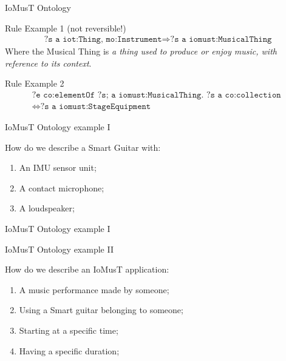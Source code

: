 \documentclass{beamer}
\begin{document}
\begin{frame}{IoMusT Ontology}
\begin{footnotesize}
\begin{block}{Rule Example 1 (not reversible!)}
\begin{multline*}
\texttt{?s a iot:Thing, mo:Instrument} 
\Rightarrow
\texttt{?s a iomust:MusicalThing}
\end{multline*}
Where the Musical Thing is \textit{a thing used to produce or enjoy music, with reference to its context}.

\end{block}\pause
\begin{block}{Rule Example 2}
\begin{multline*}
\texttt{?e co:elementOf ?s; a iomust:MusicalThing. ?s a co:collection } \\
\Leftrightarrow
\texttt{?s a iomust:StageEquipment}
\end{multline*}

\end{block} 
\end{footnotesize}
\end{frame}

\begin{frame}{IoMusT Ontology example I}
\begin{flushleft}
How do we describe a Smart Guitar with:
\begin{enumerate}
    \item An IMU sensor unit;
    \item A contact microphone;
    \item A loudspeaker;
\end{enumerate}
\end{flushleft}
\end{frame}

\begin{frame}{IoMusT Ontology example I}

\end{frame}

\begin{frame}{IoMusT Ontology example II}
\begin{flushleft}
How do we describe an IoMusT application:
\begin{enumerate}
    \item A music performance made by someone;
    \item Using a Smart guitar belonging to someone;
    \item Starting at a specific time;
    \item Having a specific duration;
\end{enumerate}
\end{flushleft}
\end{frame}
\end{document}
